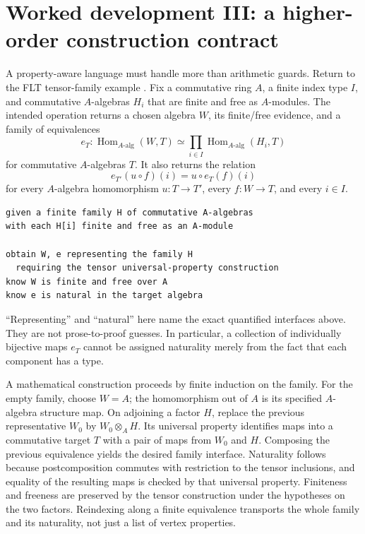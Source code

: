 \documentclass[11pt,letterpaper]{article}
\theoremstyle{definition}\newtheorem{definition}[theorem]{Definition}
\theoremstyle{remark}\newtheorem{remark}[theorem]{Remark}
\begin{document}
\section{Worked development III: a higher-order construction contract}
\label{sec:tensor}

A property-aware language must handle more than arithmetic guards. Return to
the FLT tensor-family example \cite{tensor}. Fix a commutative ring $A$, a
finite index type $I$, and commutative $A$-algebras $H_i$ that are finite and
free as $A$-modules. The intended operation returns a chosen algebra $W$, its
finite/free evidence, and a family of equivalences
\[
 e_T:\operatorname{Hom}_{A\text{-alg}}(W,T)
         \simeq\prod_{i\in I}\operatorname{Hom}_{A\text{-alg}}(H_i,T)
\]
for commutative $A$-algebras $T$. It also returns the relation
\begin{equation}\label{eq:naturality}
 e_{T'}(u\circ f)(i)=u\circ e_T(f)(i)
\end{equation}
for every $A$-algebra homomorphism $u:T\to T'$, every $f:W\to T$,
and every $i\in I$.

\begin{lstlisting}
given a finite family H of commutative A-algebras
with each H[i] finite and free as an A-module

obtain W, e representing the family H
  requiring the tensor universal-property construction
know W is finite and free over A
know e is natural in the target algebra
\end{lstlisting}
``Representing'' and ``natural'' here name the exact quantified interfaces
above. They are not prose-to-proof guesses. In particular, a collection of
individually bijective maps $e_T$ cannot be assigned naturality merely from
the fact that each component has a type.

A mathematical construction proceeds by finite induction on the family.
For the empty family, choose $W=A$; the homomorphism out of $A$ is its
specified $A$-algebra structure map. On adjoining a factor $H$, replace the
previous representative $W_0$ by $W_0\otimes_A H$. Its universal property
identifies maps into a commutative target $T$ with a pair of maps from $W_0$
and $H$. Composing the previous equivalence yields the desired family
interface. Naturality follows because postcomposition commutes with
restriction to the tensor inclusions, and equality of the resulting maps is
checked by that universal property. Finiteness and freeness are preserved by
the tensor construction under the hypotheses on the two factors. Reindexing
along a finite equivalence transports the whole family and its naturality,
not just a list of vertex properties.
\end{document}
